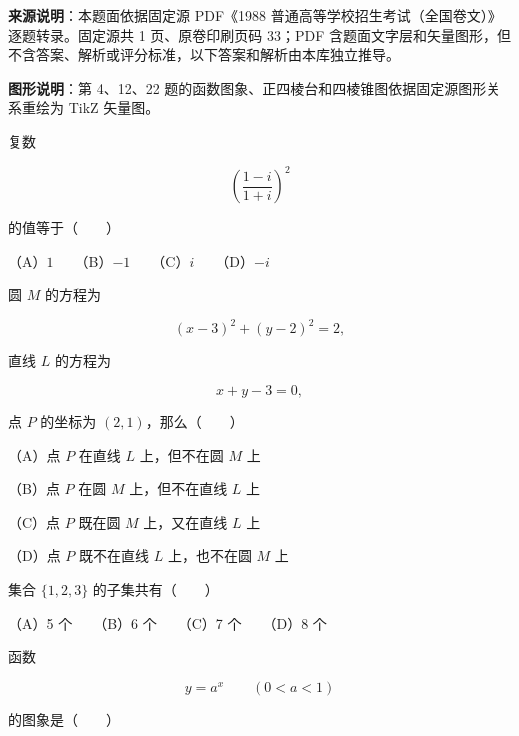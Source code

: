 


\begin{gktip}
\textbf{来源说明}：本题面依据固定源 PDF《1988 普通高等学校招生考试（全国卷文）》逐题转录。固定源共 1 页、原卷印刷页码 33；PDF 含题面文字层和矢量图形，但不含答案、解析或评分标准，以下答案和解析由本库独立推导。

\textbf{图形说明}：第 4、12、22 题的函数图象、正四棱台和四棱锥图依据固定源图形关系重绘为 TikZ 矢量图。
\end{gktip}

\begin{question}
复数

\nopagebreak[4]
\[
\left(\frac{1-i}{1+i}\right)^2
\]

的值等于\mbox{（　　）}

（A）$1$　　（B）$-1$　　（C）$i$　　（D）$-i$

\end{question}
\begin{question}
圆 $M$ 的方程为

\nopagebreak[4]
\[
(x-3)^2+(y-2)^2=2,
\]

直线 $L$ 的方程为

\nopagebreak[4]
\[
x+y-3=0,
\]

点 $P$ 的坐标为 $(2,1)$，那么\mbox{（　　）}

（A）点 $P$ 在直线 $L$ 上，但不在圆 $M$ 上

（B）点 $P$ 在圆 $M$ 上，但不在直线 $L$ 上

（C）点 $P$ 既在圆 $M$ 上，又在直线 $L$ 上

（D）点 $P$ 既不在直线 $L$ 上，也不在圆 $M$ 上

\end{question}
\begin{question}
集合 $\{1,2,3\}$ 的子集共有\mbox{（　　）}

（A）5 个　　（B）6 个　　（C）7 个　　（D）8 个

\Needspace{0.4\textheight}
\end{question}
\begin{question}
函数

\nopagebreak[4]
\[
y=a^x\qquad(0<a<1)
\]

的图象是\mbox{（　　）}
\nopagebreak[4]
\begin{center}\end{center}
\nopagebreak[4]
\end{question}
